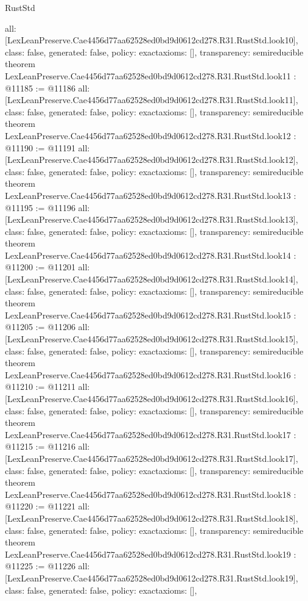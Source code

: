 \begin{lexlean}{RustStd}
\begin{coremodule}
{  all: [LexLeanPreserve.Cae4456d77aa62528ed0bd9d0612cd278.R31.RustStd.look10],
  class: false,
  generated: false,
  policy: exact{axioms: []},
  transparency: semireducible
}
theorem LexLeanPreserve.Cae4456d77aa62528ed0bd9d0612cd278.R31.RustStd.look11 : @11185 := @11186 {
  all: [LexLeanPreserve.Cae4456d77aa62528ed0bd9d0612cd278.R31.RustStd.look11],
  class: false,
  generated: false,
  policy: exact{axioms: []},
  transparency: semireducible
}
theorem LexLeanPreserve.Cae4456d77aa62528ed0bd9d0612cd278.R31.RustStd.look12 : @11190 := @11191 {
  all: [LexLeanPreserve.Cae4456d77aa62528ed0bd9d0612cd278.R31.RustStd.look12],
  class: false,
  generated: false,
  policy: exact{axioms: []},
  transparency: semireducible
}
theorem LexLeanPreserve.Cae4456d77aa62528ed0bd9d0612cd278.R31.RustStd.look13 : @11195 := @11196 {
  all: [LexLeanPreserve.Cae4456d77aa62528ed0bd9d0612cd278.R31.RustStd.look13],
  class: false,
  generated: false,
  policy: exact{axioms: []},
  transparency: semireducible
}
theorem LexLeanPreserve.Cae4456d77aa62528ed0bd9d0612cd278.R31.RustStd.look14 : @11200 := @11201 {
  all: [LexLeanPreserve.Cae4456d77aa62528ed0bd9d0612cd278.R31.RustStd.look14],
  class: false,
  generated: false,
  policy: exact{axioms: []},
  transparency: semireducible
}
theorem LexLeanPreserve.Cae4456d77aa62528ed0bd9d0612cd278.R31.RustStd.look15 : @11205 := @11206 {
  all: [LexLeanPreserve.Cae4456d77aa62528ed0bd9d0612cd278.R31.RustStd.look15],
  class: false,
  generated: false,
  policy: exact{axioms: []},
  transparency: semireducible
}
theorem LexLeanPreserve.Cae4456d77aa62528ed0bd9d0612cd278.R31.RustStd.look16 : @11210 := @11211 {
  all: [LexLeanPreserve.Cae4456d77aa62528ed0bd9d0612cd278.R31.RustStd.look16],
  class: false,
  generated: false,
  policy: exact{axioms: []},
  transparency: semireducible
}
theorem LexLeanPreserve.Cae4456d77aa62528ed0bd9d0612cd278.R31.RustStd.look17 : @11215 := @11216 {
  all: [LexLeanPreserve.Cae4456d77aa62528ed0bd9d0612cd278.R31.RustStd.look17],
  class: false,
  generated: false,
  policy: exact{axioms: []},
  transparency: semireducible
}
theorem LexLeanPreserve.Cae4456d77aa62528ed0bd9d0612cd278.R31.RustStd.look18 : @11220 := @11221 {
  all: [LexLeanPreserve.Cae4456d77aa62528ed0bd9d0612cd278.R31.RustStd.look18],
  class: false,
  generated: false,
  policy: exact{axioms: []},
  transparency: semireducible
}
theorem LexLeanPreserve.Cae4456d77aa62528ed0bd9d0612cd278.R31.RustStd.look19 : @11225 := @11226 {
  all: [LexLeanPreserve.Cae4456d77aa62528ed0bd9d0612cd278.R31.RustStd.look19],
  class: false,
  generated: false,
  policy: exact{axioms: []},
}
\end{coremodule}
\end{lexlean}
